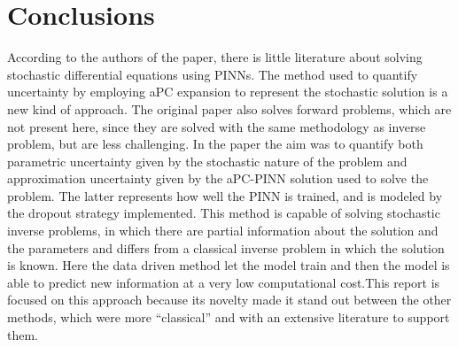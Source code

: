 \documentclass[11pt,a4paper]{article}
\begin{document}
\section{Conclusions}

According to the authors of the paper, there is little literature about solving stochastic differential equations using PINNs. The method used to quantify uncertainty by employing aPC expansion to represent the stochastic solution is a new kind of approach. The original paper also solves forward problems, which are not present here, since they are solved with the same methodology as inverse problem, but are less challenging. In the paper the aim was to quantify both parametric uncertainty given by the stochastic nature of the problem and approximation uncertainty given by the aPC-PINN solution used to solve the problem. The latter represents how well the PINN is trained, and is modeled by the dropout strategy implemented. This method is capable of solving stochastic inverse problems, in which there are partial information about the solution and the parameters and differs from a classical inverse problem in which the solution is known. Here the data driven method let the model train and then the model is able to predict new information at a very low computational cost.This report is focused on this approach because its novelty made it stand out between the other methods, which were more ``classical'' and with an extensive literature to support them.




\end{document}
